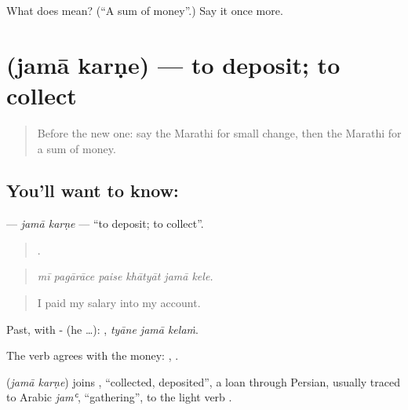\begin{tcolorbox}[breakable,colback=teal!4,colframe=teal!35!black,title={Before you move on}]
What does  mean? (\textquotedblleft{}A sum of money\textquotedblright{}.) Say it once more.
\end{tcolorbox}
\section[\texorpdfstring{\mr{जमा} \mr{करणे} (jamā karṇe)}{जमा करणे (jamā karṇe)}]{  (jamā karṇe) — to deposit; to collect}

\label{lesson:MR-C426-jama-karne}



\begin{quote}
Before the new one: say the Marathi for small change, then the Marathi for a sum of money.
\end{quote}

\subsection*{You'll want to know:  }
\textbf{ } — \emph{jamā karṇe} — \textquotedblleft{}to deposit; to collect\textquotedblright{}.

\begin{quote}
     .
\end{quote}

\begin{quote}
\emph{mī pagārāce paise khātyāt jamā kele.}
\end{quote}

\begin{quote}
I paid my salary into my account.
\end{quote}

Past, with - (he …):   , \emph{tyāne jamā kelaṁ}.

The verb agrees with the money:   ,   .

\begin{cousinweb}
\textbf{ } (\emph{jamā karṇe}) joins \textbf{}, \textquotedblleft{}collected, deposited\textquotedblright{}, a loan through Persian, usually traced to Arabic \emph{jamʿ}, \textquotedblleft{}gathering\textquotedblright{}, to the light verb \textbf{}.
\end{cousinweb}

